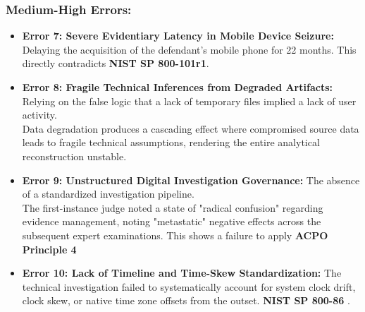 \subsubsection*{Medium-High Errors:}
\begin{itemize}
    \item \textbf{Error 7: Severe Evidentiary Latency in Mobile Device Seizure:} Delaying the acquisition of the defendant's mobile phone for 22 months. This directly contradicts \textbf{NIST SP 800-101r1}.
    \item \textbf{Error 8: Fragile Technical Inferences from Degraded Artifacts:} Relying on the false logic that a lack of temporary files implied a lack of user activity.\\ Data degradation produces a cascading effect where compromised source data leads to fragile technical assumptions, rendering the entire analytical reconstruction unstable.
    \item \textbf{Error 9: Unstructured Digital Investigation Governance:} The absence of a standardized investigation pipeline.\\
    The first-instance judge noted a state of "radical confusion" regarding evidence management, noting "metastatic" negative effects across the subsequent expert examinations. This shows a failure to apply \textbf{ACPO Principle 4}
    \item \textbf{Error 10: Lack of Timeline and Time-Skew Standardization:} The technical investigation failed to systematically account for system clock drift, clock skew, or native time zone offsets from the outset. \textbf{NIST SP 800-86} .
\end{itemize}

